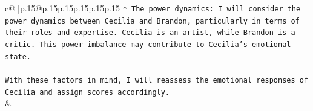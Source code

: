 \documentclass{article}
\begin{document}
{\begin{supertabular}{c@{$\;$}|p{.15\linewidth}@{}p{.15\linewidth}p{.15\linewidth}p{.15\linewidth}p{.15\linewidth}p{.15\linewidth}}
{{{\texttt{* The power dynamics: I will consider the power dynamics between Cecilia and Brandon, particularly in terms of their roles and expertise. Cecilia is an artist, while Brandon is a critic. This power imbalance may contribute to Cecilia's emotional state.} \\
\\ 
\texttt{With these factors in mind, I will reassess the emotional responses of Cecilia and assign scores accordingly.} \\
            }
        }
    }
    & \\ \\

\end{supertabular}
}
\end{document}
